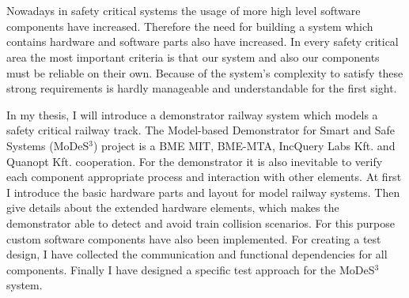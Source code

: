 \chapter{\bevezetes}
Nowadays in safety critical systems the usage of more high level software components have increased. Therefore the need for building a system which contains hardware and software parts also have increased. In every safety critical area the most important criteria is that our system and also our components must be reliable on their own. Because of the system's complexity to satisfy these strong requirements is hardly manageable and understandable for the first sight. 


In my thesis, I will introduce a demonstrator railway system which models a safety critical railway track. The Model-based Demonstrator for Smart and Safe Systems (MoDeS$^3$) project is a BME MIT, BME-MTA, IncQuery Labs Kft. and Quanopt Kft. cooperation. For the demonstrator it is also inevitable to verify each component appropriate process and interaction with other elements. At first I introduce the basic hardware parts and layout for model railway systems. Then give details about the extended hardware elements, which makes the demonstrator able to detect and avoid train collision scenarios. For this purpose custom software components have also been implemented. For creating a test design, I have collected the communication and functional dependencies for all components. Finally I have designed a specific test approach for the MoDeS$^3$ system.

